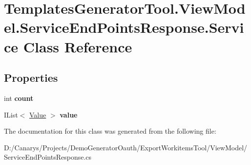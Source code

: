 \hypertarget{class_templates_generator_tool_1_1_view_model_1_1_service_end_points_response_1_1_service}{}\section{Templates\+Generator\+Tool.\+View\+Model.\+Service\+End\+Points\+Response.\+Service Class Reference}
\label{class_templates_generator_tool_1_1_view_model_1_1_service_end_points_response_1_1_service}
\subsection*{Properties}
\begin{DoxyCompactItemize}
\item 
\mbox{\label{class_templates_generator_tool_1_1_view_model_1_1_service_end_points_response_1_1_service_a60c19e07d0cd4047e9240627d58c0a14}} 
int {\bfseries count}
\item 
\mbox{\label{class_templates_generator_tool_1_1_view_model_1_1_service_end_points_response_1_1_service_abe6c1d50ac869778f9b44db7e3fa11d4}} 
I\+List$<$ \mbox{\hyperlink{class_templates_generator_tool_1_1_view_model_1_1_service_end_points_response_1_1_value}{Value}} $>$ {\bfseries value}
\end{DoxyCompactItemize}


The documentation for this class was generated from the following file\+:\begin{DoxyCompactItemize}
\item 
D\+:/\+Canarys/\+Projects/\+Demo\+Generator\+Oauth/\+Export\+Workitems\+Tool/\+View\+Model/Service\+End\+Points\+Response.\+cs\end{DoxyCompactItemize}
